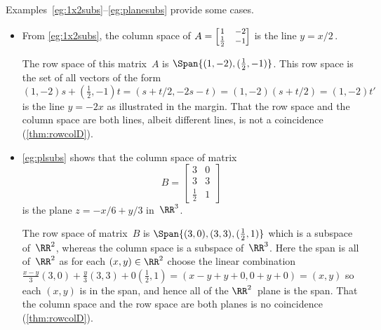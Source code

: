 \begin{example} \label{eg:}
Examples~\ref{eg:1x2subs}--\ref{eg:planesubs} provide some cases.
\begin{itemize}
\item From \autoref{eg:1x2subs}, the column space of \(A=\footnotesize\begin{bmatrix} 1&-2\\\frac12&-1 \end{bmatrix}\) is the line \(y=x/2\)\,.

The row space of this matrix~\(A\) is \(\Span\{(1,-2),(\frac12,-1)\}\).
%
This row space is the set of all vectors of the form \((1,-2)s+(\frac12,-1)t=(s+t/2,-2s-t)=(1,-2)(s+t/2)=(1,-2)t'\) is the line \(y=-2x\) as illustrated in the margin.
That the row space and the column space are both lines, albeit different lines, is not a coincidence (\autoref{thm:rowcolD}).

\item \autoref{eg:plsubs} shows that the column space of matrix
\begin{equation*}
B=\begin{bmatrix} 3&0\\3&3\\\frac12&1 \end{bmatrix}
\end{equation*}
is the plane \(z=-x/6+y/3\) in~\(\RR^3\).

The row space of matrix~\(B\) is \(\Span\{(3,0),(3,3),(\frac12,1)\}\) which is a subspace of~\(\RR^2\), whereas the column space is a subspace of~\(\RR^3\).
%
Here the span is all of~\(\RR^2\) as for each \((x,y)\in\RR^2\) choose  the linear combination \(\frac{x-y}3(3,0)+\frac{y}3(3,3)+0(\frac12,1)=(x-y+y+0,0+y+0)=(x,y)\) so each \((x,y)\) is in the span, and hence all of the \(\RR^2\)~plane is the span.
That the column space and the row space are both planes is no coincidence (\autoref{thm:rowcolD}).


\end{itemize}
\end{example}
